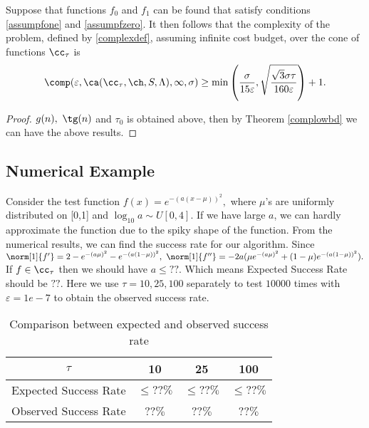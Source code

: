 \begin{theorem} \label{complowbdinteg} Suppose that functions $f_{0}$ and $f_1$ can be found that satisfy conditions \eqref{assumpfone} and \eqref{assumpfzero}.  It then follows that the complexity of the problem, defined by \eqref{complexdef}, assuming infinite cost budget, over the cone of functions $\cc_{\tau}$ is
$$
\comp(\varepsilon,\ca(\cc_{\tau},\ch,S,\Lambda),\infty,\sigma)
\ge \min\left(\frac{\sigma}{15\varepsilon},\sqrt{\frac{\sqrt{3}\sigma\tau}{160\varepsilon}}\right)+1.
$$
\end{theorem}

\begin{proof}
$g(n), \ \tg(n)$ and $\tau_0$ is obtained above, then by Theorem \ref{complowbd}
we can have the above results.
\end{proof}

\subsection{Numerical Example}
Consider the test function $f(x)=e^{-(a(x-\mu))^2},$
where $\mu$'s are uniformly distributed on [0,1] and $\log_{10} a \sim U[0,4].$
If we have large $a$, we can hardly approximate the function due to the spiky shape of the function. From the numerical results, we can find the success rate for our algorithm. Since $\norm[1]{f'}=2-e^{-(a\mu)^2}-e^{-(a(1-\mu))^2}, \ \norm[1]{f''}=-2a(\mu e^{-(a\mu)^2}+(1-\mu)e^{-(a(1-\mu))^2}).$
If $f \in \cc_{\tau}$ then we should have
$a \leq ??.$ Which means Expected Success Rate should be $??.$
Here we use $\tau = 10, 25 , 100$ separately to test $10000$ times with
$\varepsilon = 1e-7$ to obtain the observed success rate.
\begin{table}[h]
\centering
\begin{tabular}{cccc}
$\tau$ &  10 & 25 & 100\\
\toprule
Expected Success Rate &  $\leq ?? \%$ &  $\leq ?? \%$  & $\leq ?? \%$ \\
Observed Success Rate & ??$\%$ &  ??$\%$  & ??$\%$ \\
\end{tabular}
\caption{ Comparison between expected and observed success rate}
\end{table}

